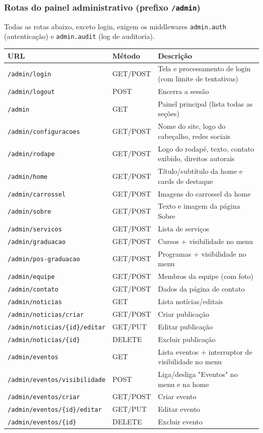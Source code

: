 \documentclass[11pt,a4paper]{article}
\begin{document}
\subsubsection{Rotas do painel administrativo (prefixo \texttt{/admin})}

Todas as rotas abaixo, exceto login, exigem os middlewares \texttt{admin.auth} (autenticação) e
\texttt{admin.audit} (log de auditoria).

\begin{longtable}{@{}p{5cm}p{3cm}p{6.5cm}@{}}
\toprule
\textbf{URL} & \textbf{Método} & \textbf{Descrição} \\
\midrule
\endhead
\texttt{/admin/login} & GET/POST & Tela e processamento de login (com limite de tentativas) \\
\texttt{/admin/logout} & POST & Encerra a sessão \\
\texttt{/admin} & GET & Painel principal (lista todas as seções) \\
\texttt{/admin/configuracoes} & GET/POST & Nome do site, logo do cabeçalho, redes sociais \\
\texttt{/admin/rodape} & GET/POST & Logo do rodapé, texto, contato exibido, direitos autorais \\
\texttt{/admin/home} & GET/POST & Título/subtítulo da home e cards de destaque \\
\texttt{/admin/carrossel} & GET/POST & Imagens do carrossel da home \\
\texttt{/admin/sobre} & GET/POST & Texto e imagem da página Sobre \\
\texttt{/admin/servicos} & GET/POST & Lista de serviços \\
\texttt{/admin/graduacao} & GET/POST & Cursos + visibilidade no menu \\
\texttt{/admin/pos-graduacao} & GET/POST & Programas + visibilidade no menu \\
\texttt{/admin/equipe} & GET/POST & Membros da equipe (com foto) \\
\texttt{/admin/contato} & GET/POST & Dados da página de contato \\
\texttt{/admin/noticias} & GET & Lista notícias/editais \\
\texttt{/admin/noticias/criar} & GET/POST & Criar publicação \\
\texttt{/admin/noticias/\{id\}/editar} & GET/PUT & Editar publicação \\
\texttt{/admin/noticias/\{id\}} & DELETE & Excluir publicação \\
\texttt{/admin/eventos} & GET & Lista eventos + interruptor de visibilidade no menu \\
\texttt{/admin/eventos/visibilidade} & POST & Liga/desliga "Eventos" no menu e na home \\
\texttt{/admin/eventos/criar} & GET/POST & Criar evento \\
\texttt{/admin/eventos/\{id\}/editar} & GET/PUT & Editar evento \\
\texttt{/admin/eventos/\{id\}} & DELETE & Excluir evento \\
\bottomrule
\end{longtable}
\end{document}
